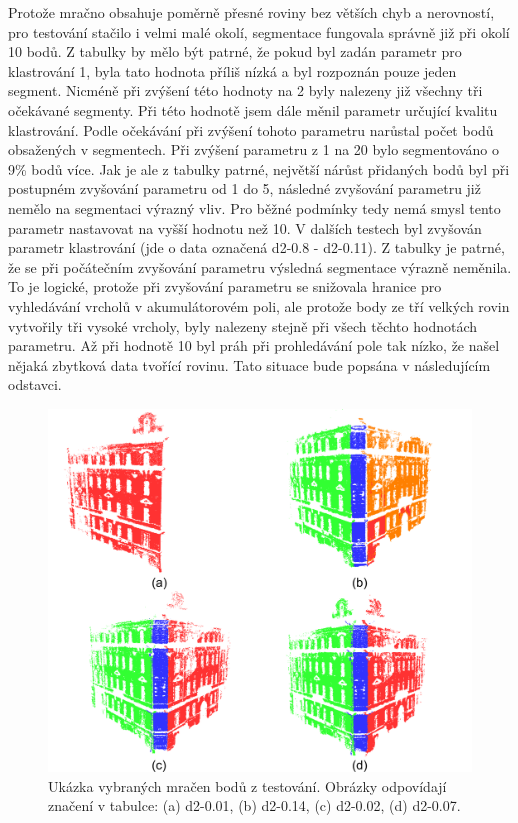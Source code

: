 \documentclass[11pt,twoside,a4paper]{book}
\begin{document}
Protože mračno obsahuje poměrně přesné roviny bez větších chyb a nerovností, pro testování stačilo i velmi malé okolí, segmentace fungovala správně již při okolí 10 bodů. Z tabulky by mělo být patrné, že pokud byl zadán parametr pro klastrování 1, byla tato hodnota příliš nízká a byl rozpoznán pouze jeden segment. Nicméně při zvýšení této hodnoty na 2 byly nalezeny již všechny tři očekávané segmenty. Při této hodnotě jsem dále měnil parametr určující kvalitu klastrování. Podle očekávání při zvýšení tohoto parametru narůstal počet bodů obsažených v segmentech. Při zvýšení parametru z 1 na 20 bylo  segmentováno o 9\% bodů více. Jak je ale z tabulky patrné, největší nárůst přidaných bodů byl při postupném zvyšování parametru od 1 do 5, následné zvyšování parametru již nemělo na segmentaci výrazný vliv. Pro běžné podmínky tedy nemá smysl tento parametr nastavovat na vyšší hodnotu než 10. V dalších testech byl zvyšován parametr klastrování (jde o data označená d2-0.8 - d2-0.11). Z tabulky je patrné, že se při počátečním zvyšování parametru výsledná segmentace výrazně neměnila. To je logické, protože při zvyšování parametru se snižovala hranice pro vyhledávání vrcholů v akumulátorovém poli, ale protože body ze tří velkých rovin vytvořily tři vysoké vrcholy, byly nalezeny stejně při všech těchto hodnotách parametru. Až při hodnotě 10 byl práh při prohledávání pole tak nízko, že našel nějaká zbytková data tvořící rovinu. Tato situace bude popsána v následujícím odstavci.

\begin{figure}[ht]
\begin{center}
\includegraphics[width=\textwidth]{figures/test-dum2-seg}
\caption{Ukázka vybraných mračen bodů z testování. Obrázky odpovídají značení v tabulce: (a) d2-0.01, (b) d2-0.14, (c) d2-0.02, (d) d2-0.07.}
\label{fig:test-dum2-seg}
\end{center}
\end{figure}
\end{document}
